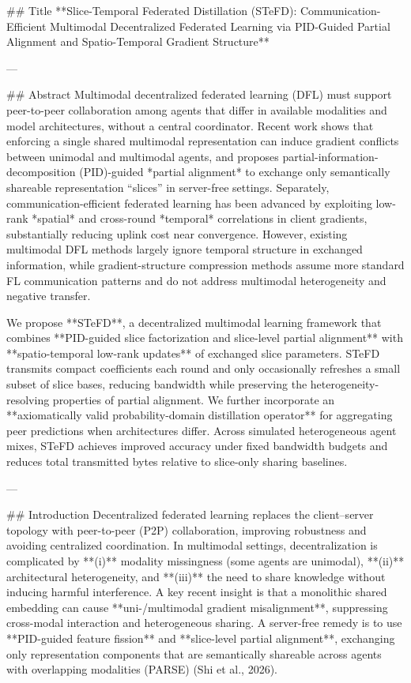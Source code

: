## Title  
**Slice-Temporal Federated Distillation (STeFD): Communication-Efficient Multimodal Decentralized Federated Learning via PID-Guided Partial Alignment and Spatio-Temporal Gradient Structure**

---

## Abstract  
Multimodal decentralized federated learning (DFL) must support peer-to-peer collaboration among agents that differ in available modalities and model architectures, without a central coordinator. Recent work shows that enforcing a single shared multimodal representation can induce gradient conflicts between unimodal and multimodal agents, and proposes partial-information-decomposition (PID)-guided *partial alignment* to exchange only semantically shareable representation “slices” in server-free settings. Separately, communication-efficient federated learning has been advanced by exploiting low-rank *spatial* and cross-round *temporal* correlations in client gradients, substantially reducing uplink cost near convergence. However, existing multimodal DFL methods largely ignore temporal structure in exchanged information, while gradient-structure compression methods assume more standard FL communication patterns and do not address multimodal heterogeneity and negative transfer.  

We propose **STeFD**, a decentralized multimodal learning framework that combines **PID-guided slice factorization and slice-level partial alignment** with **spatio-temporal low-rank updates** of exchanged slice parameters. STeFD transmits compact coefficients each round and only occasionally refreshes a small subset of slice bases, reducing bandwidth while preserving the heterogeneity-resolving properties of partial alignment. We further incorporate an **axiomatically valid probability-domain distillation operator** for aggregating peer predictions when architectures differ. Across simulated heterogeneous agent mixes, STeFD achieves improved accuracy under fixed bandwidth budgets and reduces total transmitted bytes relative to slice-only sharing baselines.

---

## Introduction  
Decentralized federated learning replaces the client–server topology with peer-to-peer (P2P) collaboration, improving robustness and avoiding centralized coordination. In multimodal settings, decentralization is complicated by **(i)** modality missingness (some agents are unimodal), **(ii)** architectural heterogeneity, and **(iii)** the need to share knowledge without inducing harmful interference. A key recent insight is that a monolithic shared embedding can cause **uni-/multimodal gradient misalignment**, suppressing cross-modal interaction and heterogeneous sharing. A server-free remedy is to use **PID-guided feature fission** and **slice-level partial alignment**, exchanging only representation components that are semantically shareable across agents with overlapping modalities (PARSE) (Shi et al., 2026).  

